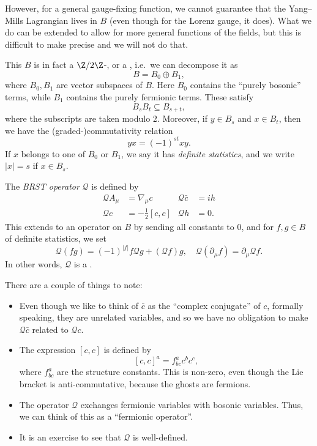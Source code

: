 \documentclass[a4paper]{article}
\begin{document}
However, for a general gauge-fixing function, we cannot guarantee that the Yang--Mills Lagrangian lives in $B$ (even though for the Lorenz gauge, it does). What we do can be extended to allow for more general functions of the fields, but this is difficult to make precise and we will not do that.

This $B$ is in fact a $\Z/2\Z$-, or a , i.e.\ we can decompose it as
\[
  B = B_0 \oplus B_1,
\]
where $B_0, B_1$ are vector subspaces of $B$. Here $B_0$ contains the ``purely bosonic'' terms, while $B_1$ contains the purely fermionic terms. These satisfy
\[
  B_s B_t \subseteq B_{s + t},
\]
where the subscripts are taken modulo $2$. Moreover, if $y \in B_s$ and $x \in B_t$, then we have the (graded-)commutativity relation
\[
  yx = (-1)^{st} xy.
\]
If $x$ belongs to one of $B_0$ or $B_1$, we say it has \emph{definite statistics}, and we write $|x| = s$ if $x \in B_s$.

\begin{defi}
  The \emph{BRST operator} $\mathcal{Q}$ is defined by
  \begin{align*}
    \mathcal{Q} A_\mu &= \nabla_\mu c & \mathcal{Q} \bar{c} &= ih\\
    \mathcal{Q} c &= - \frac{1}{2}[c, c] & \mathcal{Q} h &= 0.
  \end{align*}
  This extends to an operator on $B$ by sending all constants to $0$, and for $f, g \in B$ of definite statistics, we set
  \[
    \mathcal{Q} (fg) = (-1)^{|f|} f \mathcal{Q} g + (\mathcal{Q} f) g,\quad \mathcal{Q} (\partial_\mu f) = \partial_\mu \mathcal{Q} f.
  \]
  In other words, $\mathcal{Q}$ is a .
\end{defi}
There are a couple of things to note:
\begin{itemize}
  \item Even though we like to think of $\bar{c}$ as the ``complex conjugate'' of $c$, formally speaking, they are unrelated variables, and so we have no obligation to make $\mathcal{Q} \bar{c}$ related to $\mathcal{Q} c$.
  \item The expression $[c, c]$ is defined by
    \[
      [c, c]^a = f_{bc}^a c^b c^c,
    \]
    where $f_{bc}^a$ are the structure constants. This is non-zero, even though the Lie bracket is anti-commutative, because the ghosts are fermions.
  \item The operator $\mathcal{Q}$ exchanges fermionic variables with bosonic variables. Thus, we can think of this as a ``fermionic operator''.
  \item It is an exercise to see that $\mathcal{Q}$ is well-defined.
\end{itemize}
\end{document}
